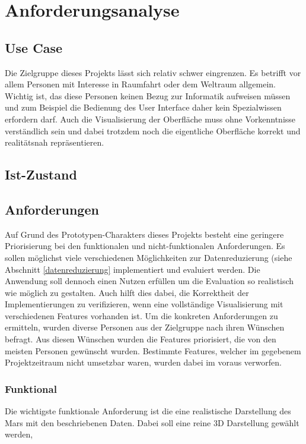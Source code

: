 \chapter{Anforderungsanalyse}

\section{Use Case}
Die Zielgruppe dieses Projekts lässt sich relativ schwer eingrenzen. Es betrifft vor allem Personen mit Interesse in Raumfahrt oder dem Weltraum allgemein. Wichtig ist, das diese Personen keinen Bezug zur Informatik aufweisen müssen und zum Beispiel die Bedienung des User Interface daher kein Spezialwissen erfordern darf. Auch die Visualisierung der Oberfläche muss ohne Vorkenntnisse verständlich sein und dabei trotzdem noch die eigentliche Oberfläche korrekt und realitätsnah repräsentieren.

\section{Ist-Zustand}

\section{Anforderungen}
Auf Grund des Prototypen-Charakters dieses Projekts besteht eine geringere Priorisierung bei den funktionalen und nicht-funktionalen Anforderungen. Es sollen möglichst viele verschiedenen Möglichkeiten zur Datenreduzierung (siehe Abschnitt \ref{datenreduzierung} implementiert und evaluiert werden. Die Anwendung soll dennoch einen Nutzen erfüllen um die Evaluation so realistisch wie möglich zu gestalten. Auch hilft dies dabei, die Korrektheit der Implementierungen zu verifizieren, wenn eine vollständige Visualisierung mit verschiedenen Features vorhanden ist. Um die konkreten Anforderungen zu ermitteln, wurden diverse Personen aus der Zielgruppe nach ihren Wünschen befragt. Aus diesen Wünschen wurden die Features priorisiert, die von den meisten Personen gewünscht wurden. Bestimmte Features, welcher im gegebenem Projektzeitraum nicht umsetzbar waren, wurden dabei im voraus verworfen. 


\subsection{Funktional}
Die wichtigste funktionale Anforderung ist die eine realistische Darstellung des Mars mit den beschriebenen Daten. Dabei soll eine reine 3D Darstellung gewählt werden, 




